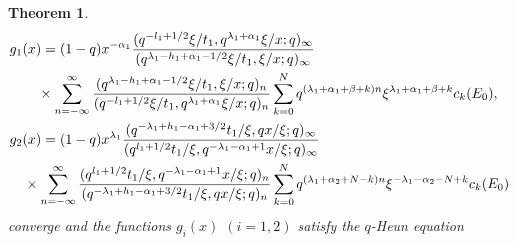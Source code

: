 \documentclass[12pt]{amsart}
\numberwithin{equation}{section}
\newtheorem{thm}{Theorem}[section]
\theoremstyle{definition}
\theoremstyle{remark}
\begin{document}
\begin{thm}
\begin{align}
 & g _1 (x) = (1 - q) x^{-\alpha_{1}} \frac{(q^{-l_{1} + 1/2}\xi/t_{1}, q^{\lambda _{1} + \alpha _{1} }\xi/x; q)_{\infty}}{(q^{ \lambda _{1} -h_1 + \alpha _{1} - 1/2 }\xi/t_{1}, \xi/x; q)_{\infty}} \label{eq:1thmg1g2}\\
 & \qquad \times \sum_{n = -\infty}^{\infty} \frac{(q^{\lambda _{1} -h_1 + \alpha _{1} - 1/2}\xi/t_{1}, \xi/x; q)_{n}}{(q^{-l_{1} + 1/2}\xi/t_{1}, q^{\lambda _{1} + \alpha _{1} }\xi/x; q)_{n}}  \sum_{k = 0}^{N} q^{( \lambda _{1} + \alpha _{1} +\beta +k )n} \xi^{ \lambda _{1} + \alpha _{1} +\beta + k} c_{k} (E_0 ) , \notag \\
 & g _2 (x) = (1 - q) x^{ \lambda _{1} } \frac{(q^{ - \lambda _{1} + h_1 - \alpha _{1} + 3/2}t_{1}/\xi, qx/\xi; q)_{\infty}}{(q^{l_{1} + 1/2}t_{1}/\xi, q^{ - \lambda _{1} - \alpha _{1}  + 1}x/\xi; q)_{\infty}} \notag \\
 & \quad \times \sum_{n = -\infty}^{\infty} \frac{(q^{l_{1} + 1/2}t_{1}/\xi, q^{ - \lambda _{1} - \alpha _{1}  + 1}x/\xi; q)_{n}}{(q^{ - \lambda _{1} + h_1 - \alpha _{1} + 3/2}t_{1}/\xi, qx/\xi; q)_{n}} \sum_{k = 0}^{N} q^{( \lambda _{1} + \alpha _{2} + N -k)n} \xi^{ -\lambda _{1} - \alpha _{2} - N +k}  c_{k} (E_0 ) \notag
    \end{align}
converge and the functions $g _i (x)$ $(i=1,2)$ satisfy the $q$-Heun equation

\end{thm}
\end{document}
